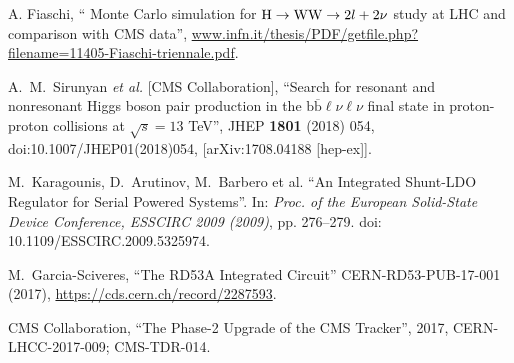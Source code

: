\documentclass[a4paper,11pt,english]{article}
\begin{document}
\vspace{-.3cm}
%
%
\begin{small}
\begin{thebibliography}{1}
 A. Fiaschi, ``  Monte Carlo simulation for ${\mathrm H} \rightarrow \mathrm{{\mathrm W} {\mathrm W}}\rightarrow 2l + 2\nu$ study at LHC and comparison with CMS data'', \url{www.infn.it/thesis/PDF/getfile.php?filename=11405-Fiaschi-triennale.pdf}.

  A.~M.~Sirunyan {\it et al.} [CMS Collaboration], ``Search for resonant and nonresonant Higgs boson pair production in the $ \mathrm{b}\overline{\mathrm{b}}\mathit{\ell \nu \ell \nu } $ final state in proton-proton collisions at $ \sqrt{s}=13 $ TeV'',  JHEP {\bf 1801} (2018) 054,  doi:10.1007/JHEP01(2018)054, [arXiv:1708.04188 [hep-ex]].

 M.~Karagounis, D.~Arutinov, M.~Barbero et al. ``An Integrated Shunt-LDO Regulator for Serial Powered Systems''. In: \textit{Proc. of the European Solid-State Device Conference,
ESSCIRC 2009 (2009)}, pp. 276–279. doi: 10.1109/ESSCIRC.2009.5325974.

 M.~Garcia-Sciveres, ``The RD53A Integrated Circuit''
CERN-RD53-PUB-17-001 (2017), \url{https://cds.cern.ch/record/2287593}.

 CMS Collaboration, ``The Phase-2 Upgrade of the CMS
  Tracker'', 2017, CERN-LHCC-2017-009; CMS-TDR-014.




\end{thebibliography}
\end{small}
\end{document}
